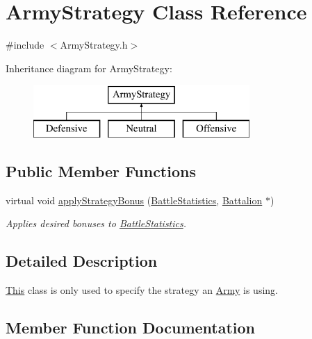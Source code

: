 \hypertarget{class_army_strategy}{}\section{Army\+Strategy Class Reference}
\label{class_army_strategy}


{\ttfamily \#include $<$Army\+Strategy.\+h$>$}

Inheritance diagram for Army\+Strategy\+:\begin{figure}[H]
\begin{center}
\leavevmode
\includegraphics[height=2.000000cm]{class_army_strategy}
\end{center}
\end{figure}
\subsection*{Public Member Functions}
\begin{DoxyCompactItemize}
\item 
virtual void \mbox{\hyperlink{class_army_strategy_ade28f2b5107c9fcdc58e73e1053e6cff}{apply\+Strategy\+Bonus}} (\mbox{\hyperlink{class_battle_statistics}{Battle\+Statistics}}, \mbox{\hyperlink{class_battalion}{Battalion}} $\ast$)
\begin{DoxyCompactList}\small\item\em Applies desired bonuses to \mbox{\hyperlink{class_battle_statistics}{Battle\+Statistics}}. \end{DoxyCompactList}\end{DoxyCompactItemize}


\subsection{Detailed Description}
\mbox{\hyperlink{class_this}{This}} class is only used to specify the strategy an \mbox{\hyperlink{class_army}{Army}} is using. 

\subsection{Member Function Documentation}
\mbox{\label{class_army_strategy_ade28f2b5107c9fcdc58e73e1053e6cff}} 

